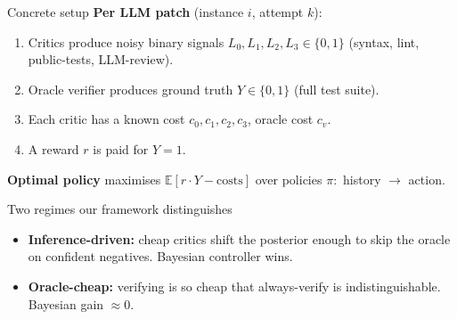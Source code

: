 \documentclass[10pt]{beamer}
\newcommand{\good}[1]{\textcolor{accentGreen}{\textbf{#1}}}
\newcommand{\warn}[1]{\textcolor{accentOrange}{\textbf{#1}}}
\newcommand{\info}[1]{\textcolor{primaryBlue}{\textbf{#1}}}
\begin{document}
\begin{frame}{Concrete setup}
\vspace{0.4cm}
\info{Per LLM patch} (instance $i$, attempt $k$):
\begin{enumerate}
\item Critics produce noisy binary signals \textcolor{primaryBlue}{$L_0, L_1, L_2, L_3 \in \{0,1\}$}
  (syntax, lint, public-tests, LLM-review).
\item Oracle verifier produces ground truth \textcolor{accentGreen}{$Y \in \{0,1\}$} (full test suite).
\item Each critic has a known cost $c_0, c_1, c_2, c_3$, oracle cost $c_v$.
\item A reward $r$ is paid for $Y{=}1$.
\end{enumerate}

\info{Optimal policy} maximises $\mathbb{E}[r \cdot Y - \text{costs}]$
over policies $\pi:$ history $\to$ action.

\vspace{0.4cm}
\begin{exampleblock}{Two regimes our framework distinguishes}
\begin{itemize}
\item \good{Inference-driven:} cheap critics shift the posterior enough to
skip the oracle on confident negatives. Bayesian controller wins.
\item \warn{Oracle-cheap:} verifying is so cheap that always-verify is
indistinguishable. Bayesian gain $\approx 0$.
\end{itemize}
\end{exampleblock}
\end{frame}
\end{document}
